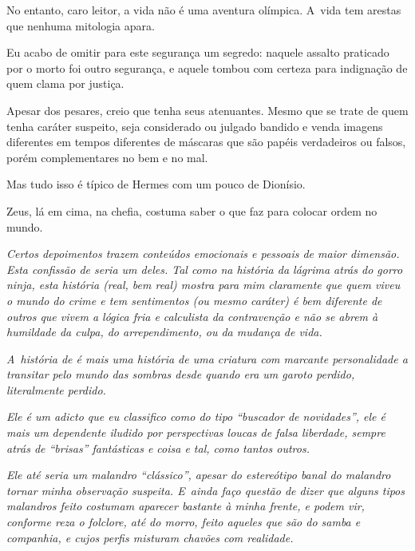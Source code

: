 \asterisc{}

No entanto, caro leitor, a vida não é uma aventura olímpica. A~vida tem
arestas que nenhuma mitologia apara.

Eu acabo de omitir para este segurança um segredo: naquele assalto
praticado por  o morto foi outro segurança, e aquele tombou com
certeza para indignação de quem clama por justiça.

Apesar dos pesares, creio que  tenha seus atenuantes. Mesmo que se
trate de quem tenha caráter suspeito, seja considerado ou julgado
bandido e venda imagens diferentes em tempos diferentes de máscaras que
são papéis verdadeiros ou falsos, porém complementares no bem e no mal.

Mas tudo isso é típico de Hermes com um pouco de Dionísio.

Zeus, lá em cima, na chefia, costuma saber o que faz para colocar ordem
no mundo.

\begin{center}\asterisc{}\end{center}
\begingroup\small

\emph{Certos depoimentos trazem conteúdos emocionais e pessoais de maior
dimensão. Esta confissão de  seria um deles. Tal como na história da
lágrima atrás do gorro ninja, esta história (real, bem real) mostra para
mim claramente que quem viveu o mundo do crime e tem sentimentos (ou
mesmo caráter) é bem diferente de outros que vivem a lógica fria e
calculista da contravenção e não se abrem à humildade da culpa, do
arrependimento, ou da mudança de vida.}

\emph{A~história de  é mais uma história de uma criatura com marcante
personalidade a transitar pelo mundo das sombras desde quando era um
garoto perdido, literalmente perdido.}

\emph{Ele é um adicto que eu classifico como do tipo ``buscador de
novidades'', ele é mais um dependente iludido por perspectivas loucas de
falsa liberdade, sempre atrás de ``brisas'' fantásticas e coisa e tal,
como tantos outros.}

\emph{Ele até seria um malandro ``clássico'', apesar do estereótipo
banal do malandro tornar minha observação suspeita. E~ainda faço questão
de dizer que alguns tipos malandros feito  costumam aparecer bastante
à minha frente, e podem vir, conforme reza o folclore, até do morro,
feito aqueles que são do samba e companhia, e cujos perfis misturam
chavões com realidade.}


